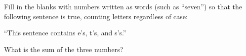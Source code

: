 Fill in the blanks with numbers written as words (such as ``seven'') so that the following sentence is true, counting letters regardless of case:
\begin{center}
``This sentence contains \underline{\hspace{1.5cm}} e's, \underline{\hspace{1.5cm}} t's, and \underline{\hspace{1.5cm}} s's.''
\end{center}
What is the sum of the three numbers?
